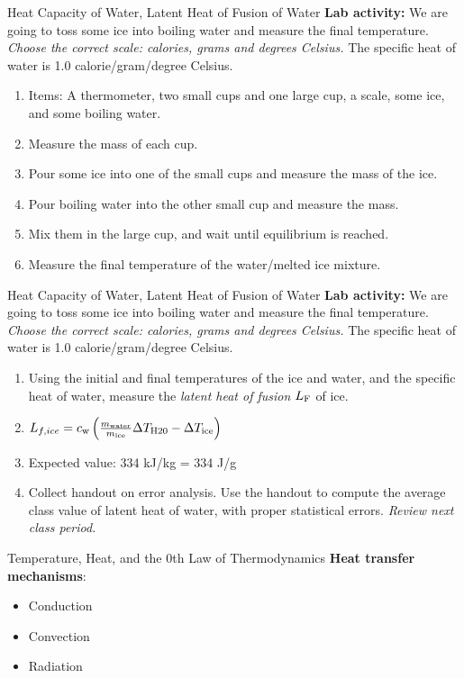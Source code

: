\documentclass{beamer}
\begin{document}
\begin{frame}{Heat Capacity of Water, Latent Heat of Fusion of Water}
\small
\textbf{Lab activity:} We are going to toss some ice into boiling water and measure the final temperature.  \textit{Choose the correct scale: calories, grams and degrees Celsius.} \alert{The specific heat of water is 1.0 calorie/gram/degree Celsius}.
\begin{enumerate}
\item Items: A thermometer, two small cups and one large cup, a scale, some ice, and some boiling water.
\item Measure the mass of each cup.
\item Pour some ice into one of the small cups and measure the mass of the ice.
\item Pour boiling water into the other small cup and measure the mass.
\item Mix them in the large cup, and wait until equilibrium is reached.
\item Measure the final temperature of the water/melted ice mixture.
\end{enumerate}
\end{frame}

\begin{frame}{Heat Capacity of Water, Latent Heat of Fusion of Water}
\small
\textbf{Lab activity:} We are going to toss some ice into boiling water and measure the final temperature.  \textit{Choose the correct scale: calories, grams and degrees Celsius.} \alert{The specific heat of water is 1.0 calorie/gram/degree Celsius}.
\begin{enumerate}
\item Using the initial and final temperatures of the ice and water, and the specific heat of water, measure the \textit{latent heat of fusion} $L_{\rm F}$ of ice.
\item $L_{f,ice} = c_{\rm w} \left( \frac{m_{\rm water}}{m_{\rm ice}} \Delta T_{\rm H20} - \Delta T_{\rm ice} \right)$
\item Expected value: 334 kJ/kg = 334 J/g
\item Collect handout on error analysis.  Use the handout to compute the average class value of latent heat of water, with proper statistical errors.  \textit{Review next class period.}
\end{enumerate}
\end{frame}

\begin{frame}{Temperature, Heat, and the 0th Law of Thermodynamics}
\textbf{Heat transfer mechanisms}:
\begin{itemize}
\item Conduction
\item Convection
\item Radiation
\end{itemize}
\end{frame}
\end{document}
